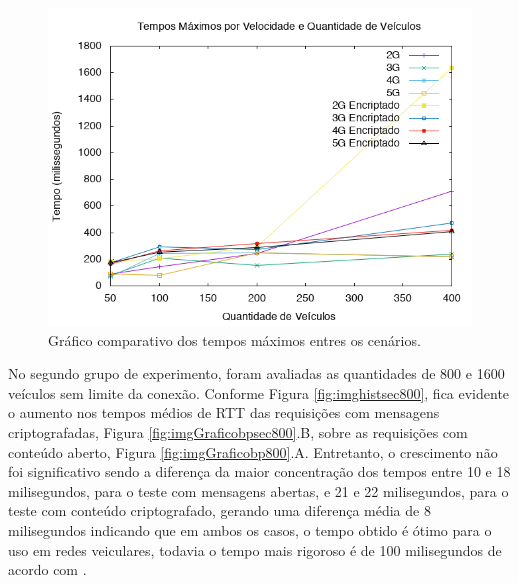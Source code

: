 \documentclass[
	12pt,				%
	oneside,			%
	a4paper,			%
	english,			%
	brazil				%
	]{abntex2ppgsi}
\begin{document}
\begin{figure}[h!]
	\centering
	\includegraphics[width=0.7\columnwidth]{images/grafico_tempo_max.png}
	\caption{Gráfico comparativo dos tempos máximos entres os cenários.}
	\label{fig:graficotempomax}
\end{figure}


No segundo grupo de experimento, foram avaliadas as quantidades de 800 e 1600 veículos sem limite da conexão. Conforme Figura \ref{fig:imghistsec800}, fica evidente o aumento nos tempos médios de RTT das requisições com mensagens criptografadas, Figura \ref{fig:imgGraficobpsec800}.B, sobre as requisições com conteúdo aberto, Figura \ref{fig:imgGraficobp800}.A. Entretanto, o crescimento não foi significativo sendo a diferença da maior concentração dos tempos entre 10 e 18 milisegundos, para o teste com mensagens abertas, e 21 e 22 milisegundos, para o teste com conteúdo criptografado, gerando uma diferença média de 8 milisegundos indicando que em ambos os casos, o tempo obtido é ótimo para o uso em redes veiculares, todavia o tempo mais rigoroso é de 100 milisegundos de acordo com .
\end{document}
